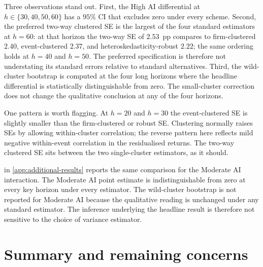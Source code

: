 Three observations stand out. First, the High AI differential at
$h \in \{30, 40, 50, 60\}$ has a $95\%$ CI that excludes zero under
every scheme. Second, the preferred two-way clustered SE is the
largest of the four standard estimators at $h = 60$: at that
horizon the two-way SE of $2.53$~pp compares to firm-clustered
$2.40$, event-clustered $2.37$, and heteroskedasticity-robust
$2.22$; the same ordering holds at $h = 40$ and $h = 50$. The
preferred specification is therefore not understating its standard
errors relative to standard alternatives. Third, the wild-cluster
bootstrap is computed at the four long horizons where the headline
differential is statistically distinguishable from zero. The
small-cluster correction does not change the qualitative
conclusion at any of the four horizons.

One pattern is worth flagging. At $h = 20$ and $h = 30$ the
event-clustered SE is slightly smaller than the firm-clustered or
robust SE. Clustering normally raises SEs by allowing within-cluster
correlation; the reverse pattern here reflects mild negative
within-event correlation in the residualised returns. The two-way
clustered SE sits between the two single-cluster estimators, as it
should.

 in \cref{app:additional-results}
reports the same comparison for the Moderate AI interaction. The
Moderate AI point estimate is indistinguishable from zero at every
key horizon under every estimator. The wild-cluster bootstrap is not
reported for Moderate AI because the qualitative reading is unchanged
under any standard estimator. The inference underlying the headline
result is therefore not sensitive to the choice of variance
estimator.

\section{Summary and remaining concerns}
\label{sec:rob-lp}

